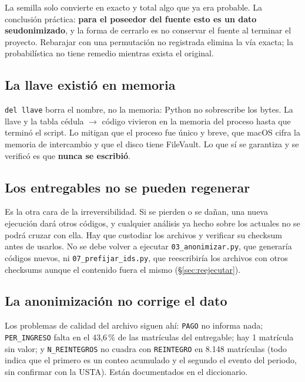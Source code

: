 \documentclass[11pt,a4paper,twoside,twocolumn]{article}
\newcommand{\cod}[1]{\nolinkurl{#1}}
\begin{document}
\begin{alerta}
La semilla solo convierte en exacto y total algo que ya era probable. La conclusión práctica:
\textbf{para el poseedor del fuente esto es un dato seudonimizado}, y la forma de cerrarlo es no
conservar el fuente al terminar el proyecto. Rebarajar con una permutación no registrada elimina
la vía exacta; la probabilística no tiene remedio mientras exista el original.
\end{alerta}

\subsection{La llave existió en memoria}

\texttt{del llave} borra el nombre, no la memoria: Python no sobrescribe los bytes. La llave y la
tabla cédula $\to$ código vivieron en la memoria del proceso hasta que terminó el script. Lo
mitigan que el proceso fue único y breve, que macOS cifra la memoria de intercambio y que el disco
tiene FileVault. Lo que sí se garantiza y se verificó es que \textbf{nunca se escribió}.

\subsection{Los entregables no se pueden regenerar}

Es la otra cara de la irreversibilidad. Si se pierden o se dañan, una nueva ejecución dará otros
códigos, y cualquier análisis ya hecho sobre los actuales no se podrá cruzar con ella. Hay que
custodiar los archivos y verificar su checksum antes de usarlos. No se debe volver a ejecutar
\cod{03_anonimizar.py}, que generaría códigos nuevos, ni \cod{07_prefijar_ids.py}, que
reescribiría los archivos con otros checksums aunque el contenido fuera el mismo
(§\ref{sec:reejecutar}).

\subsection{La anonimización no corrige el dato}

Los problemas de calidad del archivo siguen ahí: \cod{PAGO} no informa nada; \cod{PER_INGRESO}
falta en el 43,6\,\% de las matrículas del entregable; hay 1 matrícula sin valor; y
\cod{N_REINTEGROS} no cuadra con \cod{REINTEGRO} en 8.148 matrículas (todo indica que el primero
es un conteo acumulado y el segundo el evento del periodo, sin confirmar con la USTA). Están
documentados en el diccionario.
\end{document}
